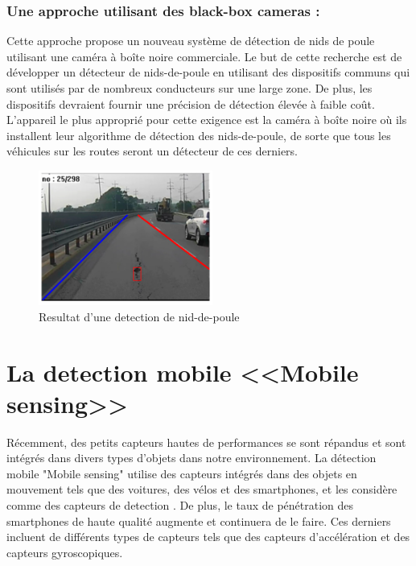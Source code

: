 \subsection{Une approche utilisant des black-box cameras :}

    Cette approche \cite{joPotholeDetectionSystem2015} propose un nouveau système de détection de nids de poule utilisant une caméra à boîte noire commerciale. Le but de cette recherche est de développer un détecteur de nids-de-poule en utilisant des dispositifs communs qui sont utilisés par de nombreux conducteurs sur une large zone. De plus, les dispositifs devraient fournir une précision de détection élevée à faible coût. L'appareil le plus approprié pour cette exigence est la caméra à boîte noire où ils installent leur algorithme de détection des nids-de-poule, de sorte que tous les véhicules sur les routes seront un détecteur de ces derniers.
    \begin{figure}[h!]
      \center
      \includegraphics[width=0.51\textwidth]{Images/chapter1/resultatDePotholDetection.jpg}
      \caption{Resultat d'une detection de nid-de-poule}
      \end{figure}



\chapter*{La detection mobile <<Mobile sensing>>}
Récemment, des petits capteurs hautes de performances se sont répandus et sont intégrés dans divers types d'objets dans notre environnement.\newline
La détection mobile "Mobile sensing" utilise des capteurs intégrés dans des objets en mouvement tels que des voitures, des vélos et des smartphones, et les considère comme des capteurs de detection \cite{nomuraMethodEstimatingRoad2015}.\newline
De plus, le taux de pénétration des smartphones de haute qualité augmente et continuera de le faire. Ces derniers incluent de différents types de capteurs tels que des capteurs d'accélération et des capteurs gyroscopiques.

